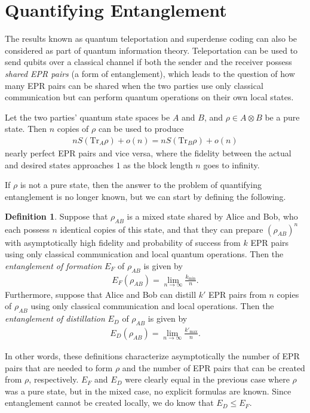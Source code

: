 \documentclass[a4paper, 12pt]{article}
\numberwithin{equation}{section}
\numberwithin{figure}{section}
\theoremstyle{definition}
\newtheorem{definition}{Definition}[section]
\begin{document}
    \section{Quantifying Entanglement}
    The results known as quantum teleportation and superdense coding can also be considered as part of quantum information theory. Teleportation can be used to send qubits over a classical channel if both the sender and the receiver possess \textit{shared EPR pairs} (a form of entanglement), which leads to the question of how many EPR pairs can be shared when the two parties use only classical communication but can perform quantum operations on their own local states. \par
    Let the two parties' quantum state spaces be $A$ and $B$, and $\rho \in A \otimes B$ be a pure state. Then $n$ copies of $\rho$ can be used to produce
    \begin{align}
        n S(\text{Tr}_A \rho) + o(n) = n S(\text{Tr}_B \rho) + o(n)
    \end{align}
    nearly perfect EPR pairs and vice versa, where the fidelity between the actual and desired states approaches $1$ as the block length $n$ goes to infinity. \par
    If $\rho$ is not a pure state, then the answer to the problem of quantifying entanglement is no longer known, but we can start by defining the following.
    \begin{definition}
        Suppose that $\rho_{AB}$ is a mixed state shared by Alice and Bob, who each possess $n$ identical copies of this state, and that they can prepare $(\rho_{AB})^n$ with asymptotically high fidelity and probability of success from $k$ EPR pairs using only classical communication and local quantum operations. Then the \textit{entanglement of formation} $E_F$ of $\rho_{AB}$ is given by
        \begin{align}
            E_F(\rho_{AB}) = \lim_{n \to \infty} \frac{k_\text{min}}{n}.
        \end{align}
        Furthermore, suppose that Alice and Bob can distill $k'$ EPR pairs from $n$ copies of $\rho_{AB}$ using only classical communication and local operations. Then the \textit{entanglement of distillation} $E_D$ of $\rho_{AB}$ is given by
        \begin{align}
            E_D(\rho_{AB}) = \lim_{n \to \infty} \frac{k'_\text{max}}{n}.
        \end{align}
    \end{definition}
    In other words, these definitions characterize asymptotically the number of EPR pairs that are needed to form $\rho$ and the number of EPR pairs that can be created from $\rho$, respectively. $E_F$ and $E_D$ were clearly equal in the previous case where $\rho$ was a pure state, but in the mixed case, no explicit formulas are known. Since entanglement cannot be created locally, we do know that $E_D \leq E_F$. \par
\end{document}
